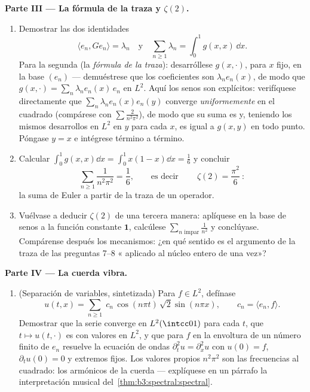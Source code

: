 \begin{problem}
\medskip
\noindent\textbf{Parte III --- La fórmula de la traza y
$\zeta(2)$.}
\begin{enumerate}[resume]
  \item Demostrar las dos identidades
        \[
        \langle e_n, Ge_n\rangle = \lambda_n
        \quad\text{y}\quad
        \sum_{n\geq1}\lambda_n = \int_0^1 g(x,x)\,\dd x .
        \]
        Para la segunda (la \emph{fórmula de la traza}): desarróllese
        $g(x, \cdot)$, para $x$ fijo, en la base $(e_n)$ --- demuéstrese
        que los coeficientes son $\lambda_ne_n(x)$, de modo que
        $g(x, \cdot) = \sum_n\lambda_ne_n(x)\,e_n$ en $L^2$. Aquí los
        senos son explícitos: verifíquese directamente que
        $\sum_n\lambda_ne_n(x)e_n(y)$ converge \emph{uniformemente} en
        el cuadrado (compárese con $\sum
        \frac2{n^2\pi^2}$), de modo que su suma es
         y, teniendo los
        mismos desarrollos en $L^2$ en $y$ para cada $x$, es igual a
        $g(x,y)$ en todo punto. Póngase $y = x$ e intégrese término a
        término. \item Calcular
        $\int_0^1g(x,x)\dd x = \int_0^1x(1-x)\dd x =
        \frac16$ y concluir
        \[
        \sum_{n\geq1}\frac{1}{n^2\pi^2} = \frac16,
        \qquad\text{es decir}\qquad
        \boxed{\ \zeta(2) = \frac{\pi^2}{6}\ } :
        \]
        la suma de Euler a partir de la traza de un operador. \item
        Vuélvase a deducir $\zeta(2)$ de una tercera manera: aplíquese
         en la base de senos a
        la función constante $\mathbf 1$, calcúlese
        $\sum_{n \text{ impar}}\frac1{n^2}$ y conclúyase. Compárense
        después los mecanismos: ¿en qué sentido es el argumento de la
        traza de las preguntas 7--8
        « aplicado al núcleo
        entero de una vez»?
\end{enumerate}

\medskip
\noindent\textbf{Parte IV --- La cuerda vibra.}
\begin{enumerate}[resume]
  \item (Separación de variables, sintetizada) Para $f \in
        L^2$, defínase
        \[
        u(t, x) = \sum_{n\geq1}\;c_n\,
        \cos(n\pi t)\,\sqrt2\sin(n\pi x),
        \qquad c_n = \langle e_n, f\rangle .
        \]
        Demostrar que la serie converge en $L^2(\intcc01)$ para cada
        $t$, que $t\mapsto u(t, \cdot)$ es
         con valores en
        $L^2$, y que para $f$ en la envoltura de un número finito de
        $e_n$ resuelve la ecuación de ondas $\partial_t^2u =
        \partial_x^2u$ con $u(0) = f$, $\partial_tu(0) = 0$ y extremos
        fijos. Los valores propios $n^2\pi^2$ son las frecuencias al
        cuadrado: los armónicos de la cuerda --- explíquese en un
        párrafo la interpretación musical
        del~\cref{thm:b3:spectral:spectral}.
\end{enumerate}


\end{problem}
